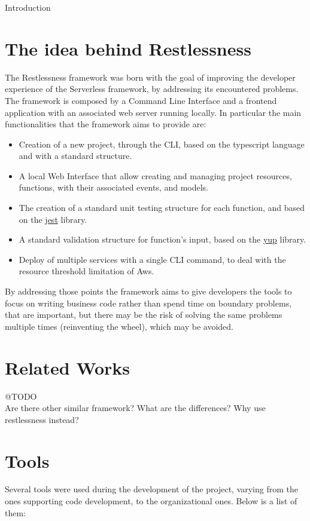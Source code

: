 \begin{chapter}{Introduction}
    \section{The idea behind Restlessness}
    The Restlessness framework was born with the goal of improving the developer
    experience of the Serverless framework, by addressing its encountered problems.
    The framework is composed by a Command Line Interface and a frontend application
    with an associated web server running locally.
    In particular the main functionalities that the framework aims to provide are:
    \begin{itemize}
        \item Creation of a new project, through the CLI, based on the typescript
            language and with a standard structure.
        \item A local Web Interface that allow creating and managing project resources,
            functions, with their associated events, and models.
        \item The creation of a standard unit testing structure for each function,
            and based on the \href{https://www.npmjs.com/package/jest}{jest} library.
        \item A standard validation structure for function's input, based on the
            \href{https://www.npmjs.com/package/yup}{yup} library.
        \item Deploy of multiple services with a single CLI command, to deal with
            the resource threshold limitation of Aws.
    \end{itemize}

    By addressing those points the framework aims to give developers the tools to
    focus on writing business code rather than spend time on boundary problems,
    that are important, but there may be the risk of solving the same problems
    multiple times (reinventing the wheel), which may be avoided.

    \section{Related Works}
    @TODO\\
    Are there other similar framework? What are the differences? Why use restlessness instead?

    \section{Tools}
    Several tools were used during the development of the project, varying from the ones supporting
    code development, to the organizational ones. Below is a list of them:


\end{chapter}
